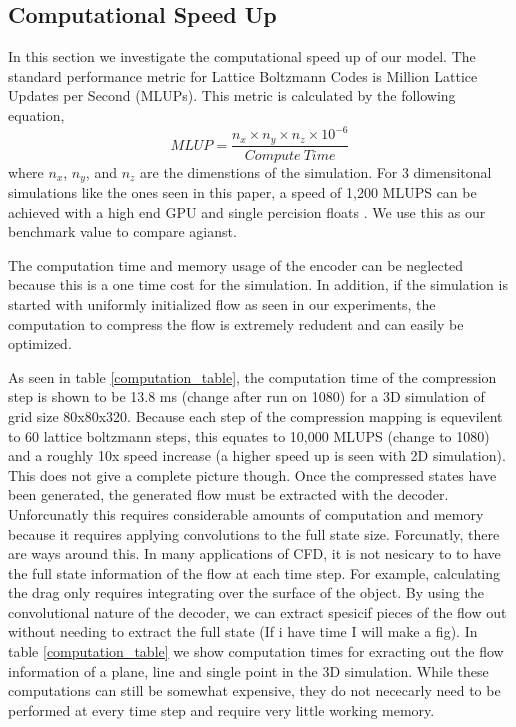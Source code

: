 \documentclass{article}
\begin{document}
\subsection{Computational Speed Up}

In this section we investigate the computational speed up of our model. The standard performance metric for Lattice Boltzmann Codes is Million Lattice Updates per Second (MLUPs). This metric is calculated by the following equation,
\begin{equation}
  MLUP = \frac{n_x \times n_y \times n_z \times 10^{-6}}{Compute \ Time}
\end{equation}
 where $n_x$, $n_y$, and $n_z$ are the dimenstions of the simulation. For 3 dimensitonal simulations like the ones seen in this paper, a speed of 1,200 MLUPS can be achieved with a high end GPU and single percision floats \cite{januszewski2014sailfish}. We use this as our benchmark value to compare agianst.

The computation time and memory usage of the encoder can be neglected because this is a one time cost for the simulation. In addition, if the simulation is started with uniformly initialized flow as seen in our experiments, the computation to compress the flow is extremely redudent and can easily be optimized.

As seen in table \ref{computation_table}, the computation time of the compression step is shown to be 13.8 ms (change after run on 1080) for a 3D simulation of grid size 80x80x320. Because each step of the compression mapping is equevilent to 60 lattice boltzmann steps, this equates to 10,000 MLUPS (change to 1080) and a roughly 10x speed increase (a higher speed up is seen with 2D simulation). This does not give a complete picture though. Once the compressed states have been generated, the generated flow must be extracted with the decoder. Unforcunatly this requires considerable amounts of computation and memory because it requires applying convolutions to the full state size. Forcunatly, there are ways around this. In many applications of CFD, it is not nesicary to to have the full state information of the flow at each time step. For example, calculating the drag only requires integrating over the surface of the object. By using the convolutional nature of the decoder, we can extract spesicif pieces of the flow out without needing to extract the full state (If i have time I will make a fig). In table \ref{computation_table} we show computation times for exracting out the flow information of a plane, line and single point in the 3D simulation. While these computations can still be somewhat expensive, they do not nececarly need to be performed at every time step and require very little working memory. 
\end{document}
